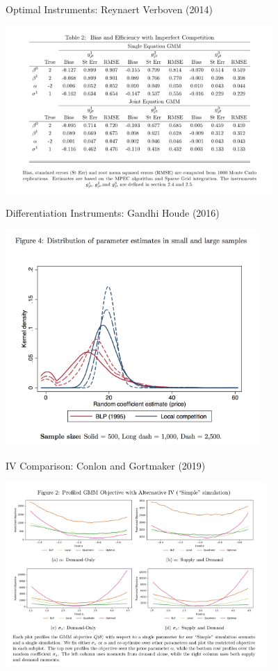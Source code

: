 \documentclass[xcolor=pdftex,dvipsnames,table,mathserif,aspectratio=169]{beamer}
\begin{document}
\begin{frame}{Optimal Instruments: Reynaert Verboven (2014)}
\begin{center}
\includegraphics[width=4in]{resources/verboven.png}
\end{center}
\end{frame}


\begin{frame}{Differentiation Instruments: Gandhi Houde (2016)}
\begin{center}
\includegraphics[width=3.8in]{resources/d_iv1.png}
\end{center}
\end{frame}


\begin{frame}{IV Comparison: Conlon and Gortmaker (2019)}
\begin{center}
\includegraphics[width=3.9in]{resources/cg_figure.png}
\end{center}
\end{frame}
\end{document}
